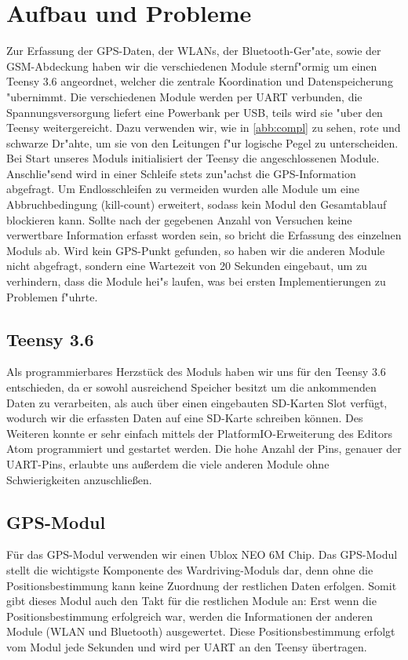 \documentclass[a4paper,11pt, ngerman]{scrartcl}
\begin{document}
\section{Aufbau und Probleme}
Zur Erfassung der GPS-Daten, der WLANs, der Bluetooth-Ger"ate, sowie der GSM-Abdeckung haben wir die verschiedenen Module sternf"ormig um einen Teensy 3.6 angeordnet, welcher die zentrale Koordination und Datenspeicherung "ubernimmt. Die verschiedenen Module werden per UART verbunden, die Spannungsversorgung liefert eine Powerbank per USB, teils wird sie "uber den Teensy weitergereicht. Dazu verwenden wir, wie in \cref{abb:compl} zu sehen, rote und schwarze Dr"ahte, um sie von den Leitungen f"ur logische Pegel zu unterscheiden.\\
Bei Start unseres Moduls initialisiert der Teensy die angeschlossenen Module. Anschlie"send wird in einer Schleife stets zun"achst die GPS-Information abgefragt. Um Endlosschleifen zu vermeiden wurden alle Module um eine Abbruchbedingung (kill-count) erweitert, sodass kein Modul den Gesamtablauf blockieren kann. Sollte nach der gegebenen Anzahl von Versuchen keine verwertbare Information erfasst worden sein, so bricht die Erfassung des einzelnen Moduls ab. Wird kein GPS-Punkt gefunden, so haben wir die anderen Module nicht abgefragt, sondern eine Wartezeit von 20 Sekunden eingebaut, um zu verhindern, dass die Module hei"s laufen, was bei ersten Implementierungen zu Problemen f"uhrte.



\subsection{Teensy 3.6}
Als programmierbares \grqq Herzstück\grqq{} des Moduls haben wir uns für den Teensy 3.6 entschieden, da er sowohl ausreichend Speicher besitzt um die ankommenden Daten zu verarbeiten, als auch über einen eingebauten SD-Karten Slot verfügt, wodurch wir die erfassten Daten auf eine SD-Karte schreiben können. Des Weiteren konnte er sehr einfach mittels der \grqq PlatformIO\grqq{}-Erweiterung des Editors \grqq Atom\grqq{} programmiert und gestartet werden. Die hohe Anzahl der Pins, genauer der UART-Pins, erlaubte uns außerdem die viele anderen Module ohne Schwierigkeiten anzuschließen.
\subsection{GPS-Modul}
Für das GPS-Modul verwenden wir einen Ublox NEO 6M Chip.
Das GPS-Modul stellt die wichtigste Komponente des Wardriving-Moduls dar, denn ohne die Positionsbestimmung kann keine Zuordnung der restlichen Daten erfolgen. Somit gibt dieses Modul auch den \grqq Takt\grqq{} für die restlichen Module an: Erst wenn die Positionsbestimmung erfolgreich war, werden die Informationen der anderen Module (WLAN und Bluetooth) ausgewertet. Diese Positionsbestimmung erfolgt vom Modul jede Sekunden und wird per UART an den Teensy übertragen.
\end{document}
